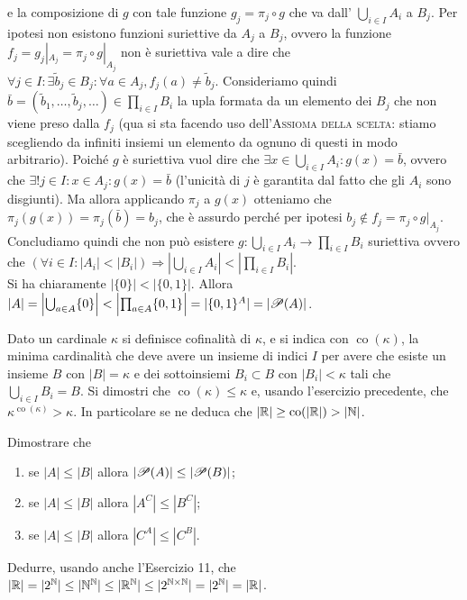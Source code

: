 \documentclass[a4paper]{article}\par \usepackage{style}\par
\begin{document}
e la composizione di $ g $ con tale funzione $ g_j = \pi_j \circ g $ che va dall' $ \bigcup_{i \in I} A_i $ a $ B_j $. Per ipotesi non esistono funzioni suriettive da $ A_j $ a $ B_j $, ovvero la funzione $ f_j = g_j |_{A_j} = \pi_j \circ g|_{A_j} $ non è suriettiva vale a dire che $ \forall j \in I: \exists \tilde{b}_j \in B_j : \forall a \in A_j, f_j(a) \neq \tilde{b}_j $. Consideriamo quindi $ \bar{b} = (\tilde{b}_1, \dots, \tilde{b}_j, \dots) \in \prod_{i \in I}B_i $ la upla formata da un elemento dei $ B_j $ che non viene preso dalla $ f_j $ (qua si sta facendo uso dell'\textsc{Assioma della scelta}: stiamo scegliendo da infiniti insiemi un elemento da ognuno di questi in modo arbitrario). Poiché $ g $ è suriettiva vuol dire che $ \exists x \in \bigcup_{i \in I} A_i : g(x) = \bar{b} $, ovvero che $ \exists! j \in I : x \in A_j : g(x) = \bar{b} $ (l'unicità di $ j $ è garantita dal fatto che gli $ A_i $ sono disgiunti). Ma allora applicando $ \pi_j $ a $ g(x) $ otteniamo che $ \pi_j(g(x)) = \pi_j(\bar{b}) = b_j $, che è assurdo perché per ipotesi $ b_j \notin f_j = \pi_j \circ g |_{A_j} $. Concludiamo quindi che non può esistere $ g \colon \bigcup_{i \in I} A_i \to \prod_{i \in I} B_i $ suriettiva ovvero che $ (\forall i \in I : |A_i| < |B_i|) \Rightarrow \left|\bigcup_{i \in I} A_i\right| < \left|\prod_{i \in I} B_i\right| $. \\
Si ha chiaramente $ |\{0\}| < |\{0, 1\}| $. Allora $ |A| = \left|\bigcup_{a \in A} \{0\}\right| < \left|\prod_{a \in A} \{0, 1\}\right| = |\{0, 1\}^A| = |\P(A)| $.\par \begin{es}[facoltativo]
  Dato un cardinale $ \kappa $ si definisce cofinalità di $ \kappa $, e si indica con $ \operatorname{co}(\kappa) $, la minima cardinalità che deve avere un insieme di indici $ I $ per avere che esiste un insieme $ B $ con $ |B| = \kappa $ e dei sottoinsiemi $ B_i \subset B $ con $ |B_i| < \kappa $ tali che $ \bigcup_{i \in I} B_i = B $. Si dimostri che $ \operatorname{co}(\kappa) \leq \kappa $ e, usando l'esercizio precedente, che $ \kappa^{\operatorname{co}(\kappa)} > \kappa $. In particolare se ne deduca che $ |\R| \geq \operatorname{co}(|\R|) > |\N| $.
\end{es}\par \begin{es}
  Dimostrare che
  \begin{enumerate}
  \item se $ |A| \leq |B| $ allora $ |\P(A)| \leq |\P(B)| $;
  \item se $ |A| \leq |B| $ allora $ |A^C| \leq |B^C| $;
  \item se $ |A| \leq |B| $ allora $ |C^A| \leq |C^B| $.
  \end{enumerate}
  Dedurre, usando anche l'Esercizio 11, che $ |\R| = |2^\N| \leq |\N^\N| \leq |\R^\N| \leq |2^{\N \times \N}| = |2^\N| = |\R| $.
\end{es}
\end{document}
